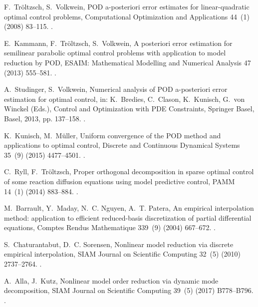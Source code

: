 \documentclass[preprint,12pt]{elsarticle}
\begin{document}
\begin{thebibliography}{10}
F.~Tr{\"o}ltzsch, S.~Volkwein, {POD} a-posteriori error estimates for
  linear-quadratic optimal control problems, Computational Optimization and
  Applications 44~(1) (2008) 83--115.
\newblock \href {https://doi.org/10.1007/s10589-008-9224-3}
  {}.

E.~Kammann, F.~Tr{\"o}ltzsch, S.~Volkwein, A posteriori error estimation for
  semilinear parabolic optimal control problems with application to model
  reduction by {POD}, ESAIM: Mathematical Modelling and Numerical Analysis 47
  (2013) 555--581.
\newblock \href {https://doi.org/10.1051/m2an/2012037}
  {}.

A.~Studinger, S.~Volkwein, Numerical analysis of {POD} a-posteriori error
  estimation for optimal control, in: K.~Bredies, C.~Clason, K.~Kunisch, G.~von
  Winckel (Eds.), Control and Optimization with PDE Constraints, Springer
  Basel, Basel, 2013, pp. 137--158.
\newblock \href {https://doi.org/10.1007/978-3-0348-0631-2\_8}
  {}.

K.~Kunisch, M.~M{\"u}ller, Uniform convergence of the {POD} method and
  applications to optimal control, Discrete and Continuous Dynamical Systems
  35~(9) (2015) 4477--4501.
\newblock \href {https://doi.org/10.3934/dcds.2015.35.4477}
  {}.

C.~Ryll, F.~Tr{\"o}ltzsch, Proper orthogonal decomposition in sparse optimal
  control of some reaction diffusion equations using model predictive control,
  PAMM 14~(1) (2014) 883--884.
\newblock \href {https://doi.org/10.1002/pamm.201410422}
  {}.

M.~Barrault, Y.~Maday, N.~C. Nguyen, A.~T. Patera, An empirical interpolation
  method: application to efficient reduced-basis discretization of partial
  differential equations, Comptes Rendus Mathematique 339~(9) (2004) 667--672.
\newblock \href {https://doi.org/10.1016/j.crma.2004.08.006}
  {}.

S.~Chaturantabut, D.~C. Sorensen, Nonlinear model reduction via discrete
  empirical interpolation, SIAM Journal on Scientific Computing 32~(5) (2010)
  2737--2764.
\newblock \href {https://doi.org/10.1137/090766498}
  {}.

A.~Alla, J.~Kutz, Nonlinear model order reduction via dynamic mode
  decomposition, SIAM Journal on Scientific Computing 39~(5) (2017) B778--B796.
\newblock \href {https://doi.org/10.1137/16M1059308}
  {}.


\end{thebibliography}
\end{document}

